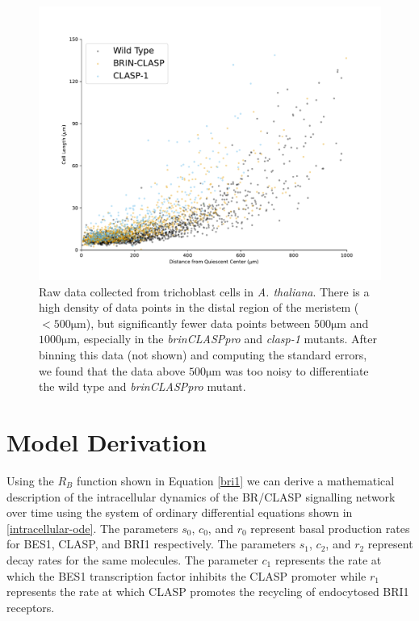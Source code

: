 \documentclass[referee,pdflatex,sn-mathphys-num]{sn-jnl}
\newcommand{\um}{\unit{\micro\metre}}
\begin{document}
\begin{appendices}
\begin{figure}
  \centering
  \includegraphics[width=\textwidth]{data-trichoblast.pdf}
  \caption{Raw data collected from trichoblast cells in \emph{A. thaliana}.
  There is a high density of data points in the distal region of the meristem ($< 500\um$), but significantly fewer data points between $500\um$ and $1000\um$, especially in the \emph{brinCLASPpro} and \emph{clasp-1} mutants.
After binning this data (not shown) and computing the standard errors, we found that the data above $500\um$ was too noisy to differentiate the wild type and \emph{brinCLASPpro} mutant. }
  \label{data}
\end{figure}

\section{Model Derivation}\label{secA2}

Using the $R_{B}$ function shown in Equation \eqref{bri1} we can derive a mathematical description of the intracellular dynamics of the BR/CLASP signalling network over time using the system of ordinary differential equations shown in \eqref{intracellular-ode}.
The parameters $s_{0}$, $c_{0}$, and $r_{0}$ represent basal production rates for BES1, CLASP, and BRI1 respectively.
The parameters $s_{1}$, $c_{2}$, and $r_{2}$ represent decay rates for the same molecules.
The parameter $c_{1}$ represents the rate at which the BES1 transcription factor inhibits the CLASP promoter while $r_{1}$ represents the rate at which CLASP promotes the recycling of endocytosed BRI1 receptors.


\end{appendices}
\end{document}
